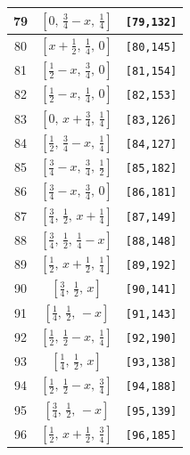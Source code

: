 \documentclass[fleqn,8pt]{jsarticle}
\begin{document}
\begin{longtable}{ccc}
79 & $\left[ 0,\, \frac{3}{4} - x,\, \frac{1}{4} \right]$ & {\tt [79,132]} \\ \hline
80 & $\left[ x + \frac{1}{2},\, \frac{1}{4},\, 0 \right]$ & {\tt [80,145]} \\ \hline
81 & $\left[ \frac{1}{2} - x,\, \frac{3}{4},\, 0 \right]$ & {\tt [81,154]} \\ \hline
82 & $\left[ \frac{1}{2} - x,\, \frac{1}{4},\, 0 \right]$ & {\tt [82,153]} \\ \hline
83 & $\left[ 0,\, x + \frac{3}{4},\, \frac{1}{4} \right]$ & {\tt [83,126]} \\ \hline
84 & $\left[ \frac{1}{2},\, \frac{3}{4} - x,\, \frac{1}{4} \right]$ & {\tt [84,127]} \\ \hline
85 & $\left[ \frac{3}{4} - x,\, \frac{3}{4},\, \frac{1}{2} \right]$ & {\tt [85,182]} \\ \hline
86 & $\left[ \frac{3}{4} - x,\, \frac{3}{4},\, 0 \right]$ & {\tt [86,181]} \\ \hline
87 & $\left[ \frac{3}{4},\, \frac{1}{2},\, x + \frac{1}{4} \right]$ & {\tt [87,149]} \\ \hline
88 & $\left[ \frac{3}{4},\, \frac{1}{2},\, \frac{1}{4} - x \right]$ & {\tt [88,148]} \\ \hline
89 & $\left[ \frac{1}{2},\, x + \frac{1}{2},\, \frac{1}{4} \right]$ & {\tt [89,192]} \\ \hline
90 & $\left[ \frac{3}{4},\, \frac{1}{2},\, x \right]$ & {\tt [90,141]} \\ \hline
91 & $\left[ \frac{1}{4},\, \frac{1}{2},\, - x \right]$ & {\tt [91,143]} \\ \hline
92 & $\left[ \frac{1}{2},\, \frac{1}{2} - x,\, \frac{1}{4} \right]$ & {\tt [92,190]} \\ \hline
93 & $\left[ \frac{1}{4},\, \frac{1}{2},\, x \right]$ & {\tt [93,138]} \\ \hline
94 & $\left[ \frac{1}{2},\, \frac{1}{2} - x,\, \frac{3}{4} \right]$ & {\tt [94,188]} \\ \hline
95 & $\left[ \frac{3}{4},\, \frac{1}{2},\, - x \right]$ & {\tt [95,139]} \\ \hline
96 & $\left[ \frac{1}{2},\, x + \frac{1}{2},\, \frac{3}{4} \right]$ & {\tt [96,185]} \\
\end{longtable}
\renewcommand{\arraystretch}{1.2}
\end{document}

